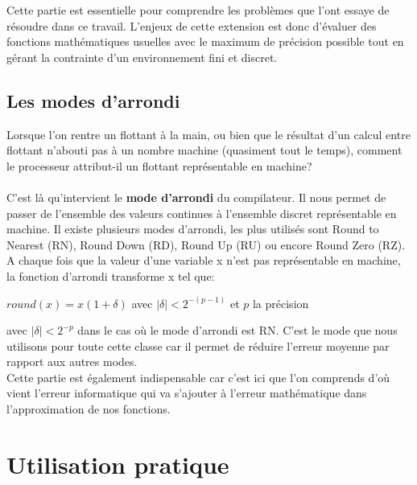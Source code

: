 \documentclass[12pt]{article}
\begin{document}
Cette partie est essentielle pour comprendre les problèmes que l'ont essaye de
résoudre dans ce travail.
L'enjeux de cette extension est donc d'évaluer des fonctions mathématiques usuelles avec le maximum de précision
possible tout en gérant la contrainte d'un environnement fini et discret.

\subsection{Les modes d'arrondi}
\label{sec:arrondis}
Lorsque l'on rentre un flottant à la main, ou bien que le résultat d'un calcul entre flottant n'abouti pas à
un nombre machine (quasiment tout le temps), comment le processeur attribut-il un flottant représentable en machine?\\
\\
C'est là qu'intervient le \textbf{mode d'arrondi} du compilateur. Il nous permet de passer de l'ensemble
des valeurs continues à l'ensemble discret représentable en machine. Il existe plusieurs modes d'arrondi,
 les plus utilisés
sont Round to Nearest (RN), Round Down (RD), Round Up (RU) ou encore Round Zero (RZ).\\
A chaque fois que la valeur d'une variable x n'est pas représentable en machine, la fonction d'arrondi
transforme x tel que:\\

\begin{center}
  $round(x) = x(1 + \delta)$  avec $|\delta| < 2^{-(p-1)}$ et $p$ la précision
\end{center}

avec $|\delta| < 2^{-p}$ dans le cas où le mode d'arrondi est RN. C'est le mode que nous utilisons
pour toute cette classe car il permet de réduire l'erreur moyenne par rapport aux autres modes.\\
Cette partie est également indispensable car c'est ici que l'on comprends d'où vient l'erreur informatique
qui va s'ajouter à l'erreur mathématique dans l'approximation de nos fonctions.


\section{Utilisation pratique}
\end{document}
